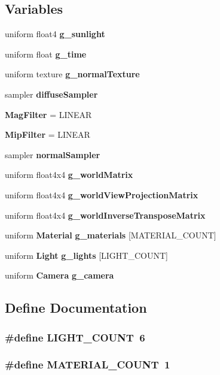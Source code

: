 \subsection*{Variables}
\begin{DoxyCompactItemize}
\item 
uniform float4 {\bf g\_\-sunlight}
\item 
uniform float {\bf g\_\-time}
\item 
uniform texture {\bf g\_\-normalTexture}
\item 
sampler {\bf diffuseSampler}
\item 
{\bf MagFilter} = LINEAR
\item 
{\bf MipFilter} = LINEAR
\item 
sampler {\bf normalSampler}
\item 
uniform float4x4 {\bf g\_\-worldMatrix}
\item 
uniform float4x4 {\bf g\_\-worldViewProjectionMatrix}
\item 
uniform float4x4 {\bf g\_\-worldInverseTransposeMatrix}
\item 
uniform {\bf Material} {\bf g\_\-materials} [MATERIAL\_\-COUNT]
\item 
uniform {\bf Light} {\bf g\_\-lights} [LIGHT\_\-COUNT]
\item 
uniform {\bf Camera} {\bf g\_\-camera}
\end{DoxyCompactItemize}


\subsection{Define Documentation}
\subsubsection[{LIGHT\_\-COUNT}]{\setlength{\rightskip}{0pt plus 5cm}\#define LIGHT\_\-COUNT~6}\label{shader_8fx_8c_a04f737f6f1242f7ca636b6d54c35510a}
\subsubsection[{MATERIAL\_\-COUNT}]{\setlength{\rightskip}{0pt plus 5cm}\#define MATERIAL\_\-COUNT~1}\label{shader_8fx_8c_a2f38322a3d382c52920aa119045881d0}


